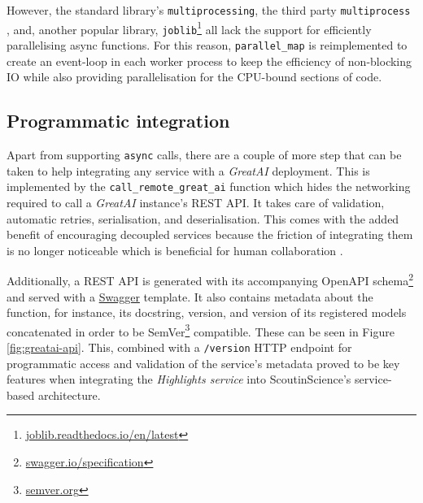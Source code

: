 However, the standard library's \texttt{multiprocessing}, the third party \texttt{multiprocess} \cite{mckerns2012building}, and, another popular library, \texttt{joblib}\footnote{\href{https://joblib.readthedocs.io/en/latest/}{joblib.readthedocs.io/en/latest}} all lack the support for efficiently parallelising async functions. For this reason, \texttt{parallel\_map} is reimplemented to create an event-loop in each worker process to keep the efficiency of non-blocking IO while also providing parallelisation for the CPU-bound sections of code.

\subsection{Programmatic integration}

Apart from supporting \texttt{async} calls, there are a couple of more step that can be taken to help integrating any service with a \textit{GreatAI} deployment. This is implemented by the \texttt{call\_remote\_great\_ai} function which hides the networking required to call a \textit{GreatAI} instance's REST API. It takes care of validation, automatic retries, serialisation, and deserialisation. This comes with the added benefit of encouraging decoupled services because the friction of integrating them is no longer noticeable which is beneficial for human collaboration \cite{hasselbring2002component}.

Additionally, a REST API is generated with its accompanying OpenAPI schema\footnote{\href{https://swagger.io/specification}{swagger.io/specification}} and served with a \href{https://swagger.io/}{Swagger} template. It also contains metadata about the function, for instance, its docstring, version, and version of its registered models concatenated in order to be SemVer\footnote{\href{https://semver.org/}{semver.org}} compatible. These can be seen in Figure \ref{fig:greatai-api}. This, combined with a \texttt{/version} HTTP endpoint for programmatic access and validation of the service's metadata proved to be key features when integrating the \textit{Highlights service} into ScoutinScience's service-based architecture.

